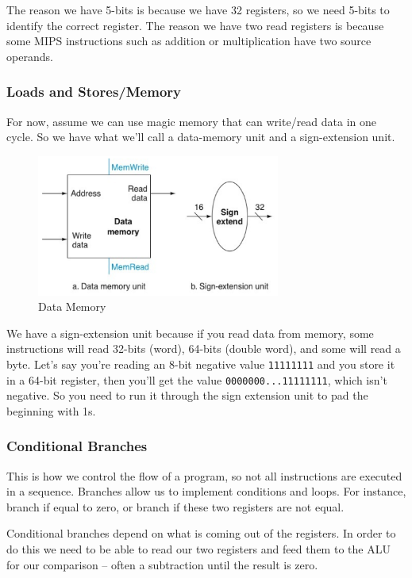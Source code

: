 \documentclass{article}
\begin{document}
The reason we have 5-bits is because we have 32 registers, so we need 5-bits to identify the correct register. The reason we have two read registers is because some MIPS instructions such as addition or multiplication have two source operands.

\subsubsection{Loads and Stores/Memory}

For now, assume we can use magic memory that can write/read data in one cycle. So we have what we'll call a data-memory unit and a sign-extension unit.

\begin{figure}[ht!]
\centering
\includegraphics[width=80mm]{img/LoadsAndStores.png}
\caption{Data Memory}
\end{figure}

We have a sign-extension unit because if you read data from memory, some instructions will read 32-bits (word), 64-bits (double word), and some will read a byte. Let's say you're reading an 8-bit negative value \texttt{11111111} and you store it in a 64-bit register, then you'll get the value \texttt{0000000...11111111}, which isn't negative. So you need to run it through the sign extension unit to pad the beginning with 1s.

\subsubsection{Conditional Branches}

This is how we control the flow of a program, so not all instructions are executed in a sequence. Branches allow us to implement conditions and loops. For instance, branch if equal to zero, or branch if these two registers are not equal.

Conditional branches depend on what is coming out of the registers. In order to do this we need to be able to read our two registers and feed them to the ALU for our comparison -- often a subtraction until the result is zero.
\end{document}
